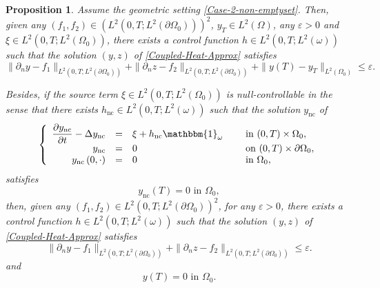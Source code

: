 \documentclass[JEP,XML,SOM,Unicode,NoFloatCountersInSection]{cedram}
\newcommand{\nc}{\mathrm{nc}}
\newtheorem{proposition}[theorem]{Proposition}
\theoremstyle{definition}
\begin{document}
\begin{proposition}
\label{Prop-Approx-Cont-Case2}
Assume the geometric setting \eqref{Case-2-non-emptyset}. Then, given any $(f_1, f_2) \in (L^2(0,T; L^2(\partial \Omega_0)))^2$, $y_T \in L^2(\Omega)$, any $\varepsilon >0$ and $\xi \in L^2(0,T; L^2(\Omega_0))$, there exists a control function $h \in L^2(0,T; L^2(\omega))$ such that the solution $(y,z)$ of \eqref{Coupled-Heat-Approx} satisfies
\begin{equation}
\label{Approx-Cont-Case2}
\| \partial_n y - f_1 \|_{L^2(0,T; L^2(\partial\Omega_0))}
+
\| \partial_n z - f_2 \|_{L^2(0,T; L^2(\partial\Omega_0))}
+
\| y(T) - y_T \|_{L^2(\Omega_0)}
\leq
\varepsilon.
\end{equation}

Besides, if {the source term} $\xi \in L^2(0,T; L^2(\Omega_0))$ is null-controllable in the sense that there exists $h_{\nc} \in L^2(0,T; L^2(\omega))$ such that the solution $y_{\nc}$ of
\begin{equation}
\label{y-nc}
\left\{
\begin{array}{rcll}
\dfrac{\partial y_{\nc}}{\partial t}-\Delta y_{\nc} &=&\xi +h_{\nc} \mathbbm{1}_{\omega}\quad&\text{ in }(0,T) \times \Omega_0,
\\
y_{\nc} &=& 0 &\text{ on }(0,T) \times \partial \Omega_0,
\\
y_{\nc}\left(0,\cdot\right) &=& 0 &\text{ in }\Omega_0,
\end{array}
\right.
\end{equation}
satisfies
\begin{equation}
\label{NC-Assumption}
y_{\nc}(T) = 0 \text{ in } \Omega_0,
\end{equation}
then, given any $(f_1, f_2) \in L^2(0,T; L^2(\partial \Omega_0))^2$, for any $\varepsilon >0$, there exists a control function $h \in L^2(0,T; L^2(\omega))$ such that the solution $(y,z)$ of \eqref{Coupled-Heat-Approx} satisfies
\begin{equation}
\label{Approx-Cont-2}
\| \partial_n y - f_1 \|_{L^2(0,T; L^2(\partial\Omega_0))}
+
\| \partial_n z - f_2 \|_{L^2(0,T; L^2(\partial\Omega_0))}
\leq
\varepsilon.
\end{equation}
and
\begin{equation}
\label{NullControl}
y(T) = 0 \text{ in } \Omega_0.
\end{equation}
\end{proposition}
\end{document}
